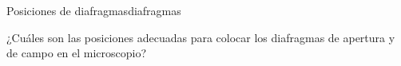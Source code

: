 \begin{problem}{Posiciones de diafragmas}{diafragmas}

¿Cuáles son las posiciones adecuadas para colocar los diafragmas de apertura y de campo en el microscopio?

\end{problem}